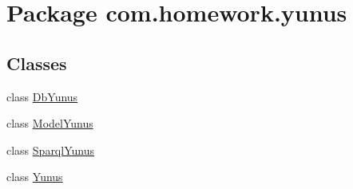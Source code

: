 \hypertarget{namespacecom_1_1homework_1_1yunus}{}\section{Package com.\+homework.\+yunus}
\label{namespacecom_1_1homework_1_1yunus}
\subsection*{Classes}
\begin{DoxyCompactItemize}
\item 
class \hyperlink{classcom_1_1homework_1_1yunus_1_1_db_yunus}{Db\+Yunus}
\item 
class \hyperlink{classcom_1_1homework_1_1yunus_1_1_model_yunus}{Model\+Yunus}
\item 
class \hyperlink{classcom_1_1homework_1_1yunus_1_1_sparql_yunus}{Sparql\+Yunus}
\item 
class \hyperlink{classcom_1_1homework_1_1yunus_1_1_yunus}{Yunus}
\end{DoxyCompactItemize}
